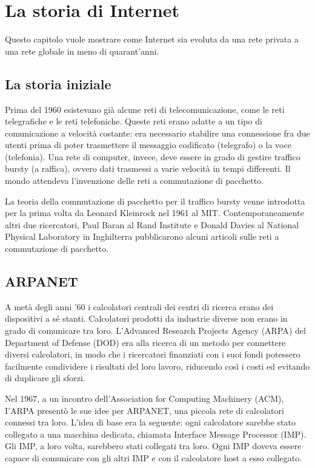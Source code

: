 \chapter{La storia di Internet}
Questo capitolo vuole mostrare come Internet sia evoluta da una rete privata a una rete globale in meno di quarant'anni.

\section{La storia iniziale}
Prima del 1960 esistevano già alcune reti di telecomunicazione, come le reti telegrafiche e le reti telefoniche. Queste reti erano adatte a un tipo di comunicazione a velocità costante: era necessario stabilire una connessione fra due utenti prima di poter trasmettere il messaggio codificato (telegrafo) o la voce (telefonia). Una rete di computer, invece, deve essere in grado di gestire traffico bursty (a raffica), ovvero dati trasmessi a varie velocità in tempi differenti. Il mondo attendeva l'invenzione delle reti a commutazione di pacchetto.

La teoria della commutazione di pacchetto per il traffico bursty venne introdotta per la prima volta da Leonard Kleinrock nel 1961 al MIT. Contemporaneamente altri due ricercatori, Paul Baran al Rand Institute e Donald Davies al National Physical Laboratory in Inghilterra pubblicarono alcuni articoli sulle reti a commutazione di pacchetto.

\section{ARPANET}
A metà degli anni '60 i calcolatori centrali dei centri di ricerca erano dei dispositivi a sé stanti. Calcolatori prodotti da industrie diverse non erano in grado di comunicare tra loro. L'Advanced Research Projects Agency (ARPA) del Department of Defense (DOD) era alla ricerca di un metodo per connettere diversi calcolatori, in modo che i ricercatori finanziati con i suoi fondi potessero facilmente condividere i risultati del loro lavoro, riducendo così i costi ed evitando di duplicare gli sforzi.

Nel 1967, a un incontro dell'Association for Computing Machinery (ACM), I'ARPA presentò le sue idee per ARPANET, una piccola rete di calcolatori connessi tra loro. L'idea di base era la seguente: ogni calcolatore sarebbe stato collegato a una macchina dedicata, chiamata Interface Message Processor (IMP). Gli IMP, a loro volta, sarebbero stati collegati tra loro. Ogni IMP doveva essere capace di comunicare con gli altri IMP e con il calcolatore host a esso collegato.

